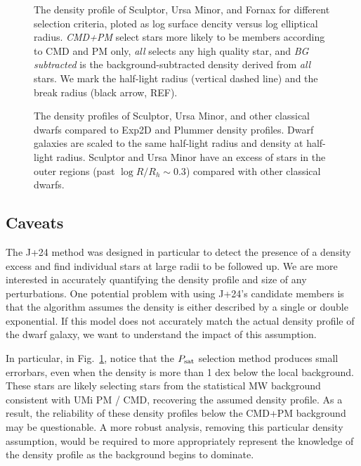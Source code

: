 \begin{figure}
\centering
{}
\caption[Sculptor density profiles]{The density profile of Sculptor,
Ursa Minor, and Fornax for different selection criteria, ploted as log
surface dencity versus log elliptical radius. \emph{CMD+PM} select stars
more likely to be members according to CMD and PM only, \emph{all}
selects any high quality star, and \emph{BG subtracted} is the
background-subtracted density derived from \emph{all} stars. We mark the
half-light radius (vertical dashed line) and the break radius (black
arrow, REF).}\label{fig:scl_observed_profiles}
\end{figure}

\begin{figure}
\centering
{}
\caption[Classical dwarf density profiles]{The density profiles of
Sculptor, Ursa Minor, and other classical dwarfs compared to Exp2D and
Plummer density profiles. Dwarf galaxies are scaled to the same
half-light radius and density at half-light radius. Sculptor and Ursa
Minor have an excess of stars in the outer regions (past
\(\log R/R_h \sim 0.3\)) compared with other classical
dwarfs.}\label{fig:classical_dwarfs_densities}
\end{figure}

\subsection{Caveats}\label{caveats}

The J+24 method was designed in particular to detect the presence of a
density excess and find individual stars at large radii to be followed
up. We are more interested in accurately quantifying the density profile
and size of any perturbations. One potential problem with using J+24's
candidate members is that the algorithm assumes the density is either
described by a single or double exponential. If this model does not
accurately match the actual density profile of the dwarf galaxy, we want
to understand the impact of this assumption.

In particular, in Fig.~\ref{fig:scl_observed_profiles}, notice that the
\(P_{\rm sat}\) selection method produces small errorbars, even when the
density is more than 1 dex below the local background. These stars are
likely selecting stars from the statistical MW background consistent
with UMi PM / CMD, recovering the assumed density profile. As a result,
the reliability of these density profiles below the CMD+PM background
may be questionable. A more robust analysis, removing this particular
density assumption, would be required to more appropriately represent
the knowledge of the density profile as the background begins to
dominate.

